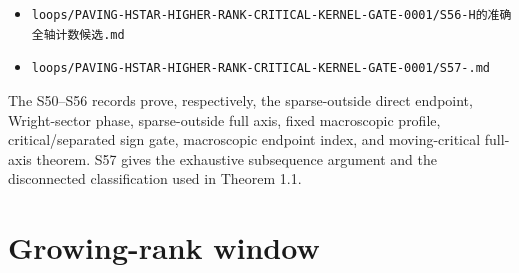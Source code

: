 \documentclass[10pt]{article}
\begin{document}
\begin{itemize}
\item \texttt{loops/\allowbreak{}PAVING-\allowbreak{}HSTAR-\allowbreak{}HIGHER-\allowbreak{}RANK-\allowbreak{}CRITICAL-\allowbreak{}KERNEL-\allowbreak{}GATE-\allowbreak{}0001/\allowbreak{}S56-H{\cjkfont 的\allowbreak{}准\allowbreak{}确\allowbreak{}全\allowbreak{}轴\allowbreak{}计\allowbreak{}数\allowbreak{}候\allowbreak{}选}.\allowbreak{}md}
\item \texttt{loops/\allowbreak{}PAVING-\allowbreak{}HSTAR-\allowbreak{}HIGHER-\allowbreak{}RANK-\allowbreak{}CRITICAL-\allowbreak{}KERNEL-\allowbreak{}GATE-\allowbreak{}0001/\allowbreak{}S57-.\allowbreak{}md}
\end{itemize}

The S50--S56 records prove, respectively, the sparse-outside direct endpoint,
Wright-sector phase, sparse-outside full axis, fixed macroscopic profile,
critical/separated sign gate, macroscopic endpoint index, and moving-critical
full-axis theorem.  S57 gives the exhaustive subsequence argument and the
disconnected classification used in Theorem 1.1.

\section{Growing-rank window}
\end{document}
